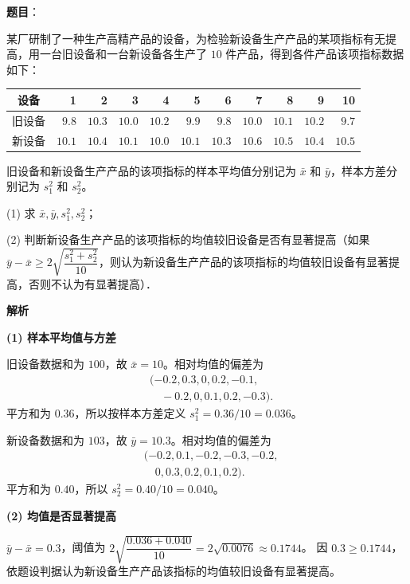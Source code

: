 \begin{answer}

\textbf{题目}：

某厂研制了一种生产高精产品的设备，为检验新设备生产产品的某项指标有无提高，用一台旧设备和一台新设备各生产了 $10$ 件产品，得到各件产品该项指标数据如下：

\begin{center}
\begingroup\setlength{\tabcolsep}{4pt}
\begin{tabular}{crrrrrrrrrr}
\toprule
设备 & 1 & 2 & 3 & 4 & 5 & 6 & 7 & 8 & 9 & 10 \\
\midrule
旧设备 & $9.8$ & $10.3$ & $10.0$ & $10.2$ & $9.9$ & $9.8$ & $10.0$ & $10.1$ & $10.2$ & $9.7$ \\
新设备 & $10.1$ & $10.4$ & $10.1$ & $10.0$ & $10.1$ & $10.3$ & $10.6$ & $10.5$ & $10.4$ & $10.5$ \\
\bottomrule
\end{tabular}
\endgroup
\end{center}

旧设备和新设备生产产品的该项指标的样本平均值分别记为 $\bar x$ 和 $\bar y$，样本方差分别记为 $s_1^2$ 和 $s_2^2$。

  (1) 求 $\bar x,\bar y,s_1^2,s_2^2$；

  (2) 判断新设备生产产品的该项指标的均值较旧设备是否有显著提高（如果 $\bar y-\bar x\geqslant2\sqrt{\dfrac{s_1^2+s_2^2}{10}}$，则认为新设备生产产品的该项指标的均值较旧设备有显著提高，否则不认为有显著提高）．

\textbf{解析}

\textbf{(1) 样本平均值与方差}

旧设备数据和为 $100$，故 $\bar x=10$。相对均值的偏差为
\nopagebreak[4]
\[
\begin{aligned}
&(-0.2,0.3,0,0.2,-0.1,\\
&\quad -0.2,0,0.1,0.2,-0.3).
\end{aligned}
\]
平方和为 $0.36$，所以按样本方差定义 $s_1^2=0.36/10=0.036$。

新设备数据和为 $103$，故 $\bar y=10.3$。相对均值的偏差为
\nopagebreak[4]
\[
\begin{aligned}
&(-0.2,0.1,-0.2,-0.3,-0.2,\\
&\quad 0,0.3,0.2,0.1,0.2).
\end{aligned}
\]
平方和为 $0.40$，所以 $s_2^2=0.40/10=0.040$。

\textbf{(2) 均值是否显著提高}

$\bar y-\bar x=0.3$，阈值为
$2\sqrt{\dfrac{0.036+0.040}{10}}=2\sqrt{0.0076}\approx0.1744$。
因 $0.3\geqslant0.1744$，依题设判据认为新设备生产产品该指标的均值较旧设备有显著提高。



\end{answer}
